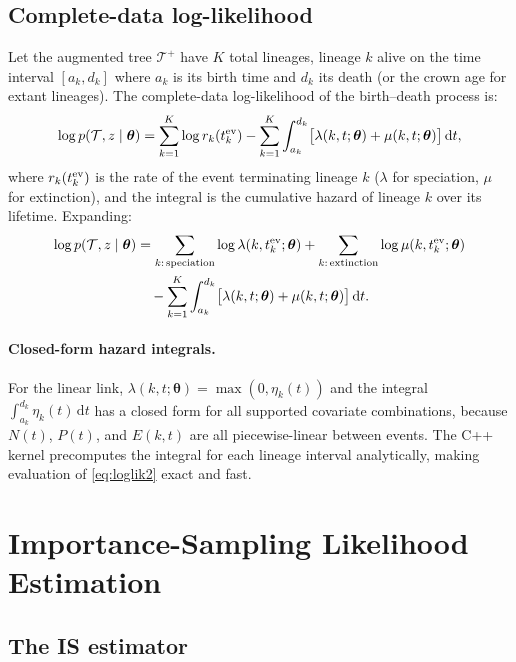 \documentclass[12pt,a4paper]{article}
\newcommand{\obs}{\mathcal{T}}
\newcommand{\aug}{\mathcal{T}^+}
\newcommand{\pars}{\bm{\theta}}
\newcommand{\dd}{\,\mathrm{d}}
\begin{document}
\subsection{Complete-data log-likelihood}\label{sec:loglik}

Let the augmented tree $\aug$ have $K$ total lineages, lineage $k$ alive on
the time interval $[a_k, d_k]$ where $a_k$ is its birth time and $d_k$ its
death (or the crown age for extant lineages). The complete-data
log-likelihood of the birth--death process is:
\begin{equation}\label{eq:loglik}
  \log p(\obs, z \mid \pars)
  = \sum_{k=1}^{K} \log r_k(t_k^{\rm ev})
    - \sum_{k=1}^{K} \int_{a_k}^{d_k}
      \bigl[\lambda(k,t;\pars) + \mu(k,t;\pars)\bigr]\dd t,
\end{equation}
where $r_k(t_k^{\rm ev})$ is the rate of the event terminating lineage $k$
($\lambda$ for speciation, $\mu$ for extinction), and the integral is the
cumulative hazard of lineage $k$ over its lifetime. Expanding:
\begin{align}
  \log p(\obs, z \mid \pars)
  &= \sum_{k:\,\text{speciation}} \log \lambda(k, t_k^{\rm ev};\pars)
   + \sum_{k:\,\text{extinction}} \log \mu(k, t_k^{\rm ev};\pars)
   \nonumber\\
  &\quad - \sum_{k=1}^{K}
    \int_{a_k}^{d_k}
    \bigl[\lambda(k,t;\pars) + \mu(k,t;\pars)\bigr]\dd t.
    \label{eq:loglik2}
\end{align}

\paragraph{Closed-form hazard integrals.}
For the linear link, $\lambda(k,t;\pars) = \max(0, \eta_k(t))$ and the
integral $\int_{a_k}^{d_k} \eta_k(t)\dd t$ has a closed form for all
supported covariate combinations, because $N(t)$, $P(t)$, and $E(k,t)$
are all piecewise-linear between events. The C++ kernel precomputes the
integral for each lineage interval analytically, making evaluation of
\eqref{eq:loglik2} exact and fast.

\section{Importance-Sampling Likelihood Estimation}\label{sec:IS}

\subsection{The IS estimator}
\end{document}
